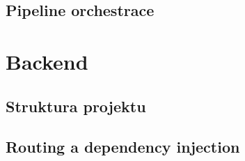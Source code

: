 
\subsection{Pipeline orchestrace}


\section{Backend}
\label{sec:backend}


\subsection{Struktura projektu}


\subsection{Routing a dependency injection}


